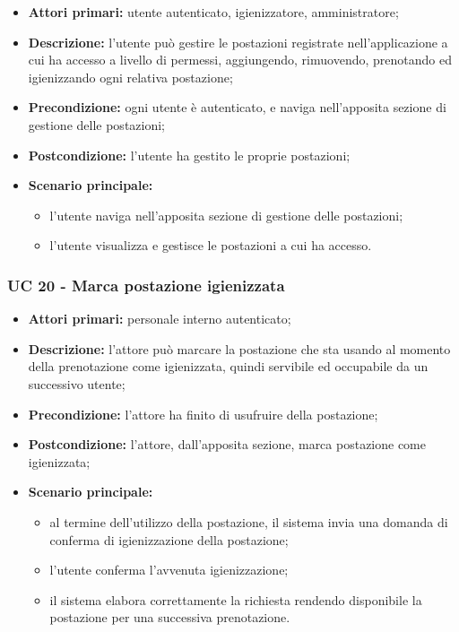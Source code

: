 \begin{itemize}
\item \textbf{Attori primari:} utente autenticato, igienizzatore, amministratore;
\item \textbf{Descrizione:} l’utente può gestire le postazioni registrate nell’applicazione a cui ha accesso a livello di permessi, aggiungendo, rimuovendo, prenotando ed igienizzando ogni relativa postazione;
\item \textbf{Precondizione:} ogni utente è autenticato, e naviga nell’apposita sezione di gestione delle postazioni;
\item \textbf{Postcondizione:} l’utente ha gestito le proprie postazioni;
\item \textbf{Scenario principale:} 
	\begin{itemize}
		\item l’utente naviga nell’apposita sezione di gestione delle postazioni;
		\item l’utente visualizza e gestisce le postazioni a cui ha accesso.
	\end{itemize}
\end{itemize}


\subsubsection{UC 20 - Marca postazione igienizzata}

\begin{itemize}
\item \textbf{Attori primari:} personale interno autenticato;
\item \textbf{Descrizione:} l'attore può marcare la postazione che sta usando al momento della prenotazione come igienizzata, quindi servibile ed occupabile da un successivo utente;
\item \textbf{Precondizione:} l'attore ha finito di usufruire della postazione; 
\item \textbf{Postcondizione:} l’attore, dall'apposita sezione, marca postazione come igienizzata;
\item \textbf{Scenario principale:} 
	\begin{itemize}
		\item al termine dell'utilizzo della postazione, il sistema invia una domanda di conferma di igienizzazione della postazione;		
		\item l’utente conferma l'avvenuta igienizzazione;
		\item il sistema elabora correttamente la richiesta rendendo disponibile la postazione per una successiva prenotazione.
	\end{itemize}
\end{itemize}


